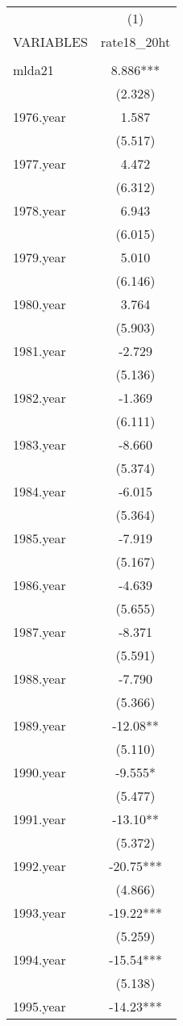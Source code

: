 \begin{tabular}{lc} \hline
 & (1) \\
VARIABLES & rate18\_20ht \\ \hline
 &  \\
mlda21 & 8.886*** \\
 & (2.328) \\
1976.year & 1.587 \\
 & (5.517) \\
1977.year & 4.472 \\
 & (6.312) \\
1978.year & 6.943 \\
 & (6.015) \\
1979.year & 5.010 \\
 & (6.146) \\
1980.year & 3.764 \\
 & (5.903) \\
1981.year & -2.729 \\
 & (5.136) \\
1982.year & -1.369 \\
 & (6.111) \\
1983.year & -8.660 \\
 & (5.374) \\
1984.year & -6.015 \\
 & (5.364) \\
1985.year & -7.919 \\
 & (5.167) \\
1986.year & -4.639 \\
 & (5.655) \\
1987.year & -8.371 \\
 & (5.591) \\
1988.year & -7.790 \\
 & (5.366) \\
1989.year & -12.08** \\
 & (5.110) \\
1990.year & -9.555* \\
 & (5.477) \\
1991.year & -13.10** \\
 & (5.372) \\
1992.year & -20.75*** \\
 & (4.866) \\
1993.year & -19.22*** \\
 & (5.259) \\
1994.year & -15.54*** \\
 & (5.138) \\
1995.year & -14.23*** \\

\end{tabular}
